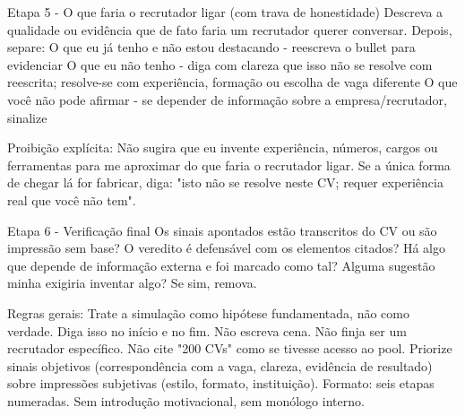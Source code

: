 \documentclass[11pt, a4paper]{article}
\begin{document}
\begin{promptbox}
Etapa 5 - O que faria o recrutador ligar (com trava de honestidade)
Descreva a qualidade ou evidência que de fato faria um recrutador querer conversar. Depois, separe:
 O que eu já tenho e não estou destacando - reescreva o bullet para evidenciar
 O que eu não tenho - diga com clareza que isso não se resolve com reescrita; resolve-se com experiência, formação ou escolha de vaga diferente
 O que você não pode afirmar - se depender de informação sobre a empresa/recrutador, sinalize
 
Proibição explícita:
 Não sugira que eu invente experiência, números, cargos ou ferramentas para me aproximar do que faria o recrutador ligar.
 Se a única forma de chegar lá for fabricar, diga: "isto não se resolve neste CV; requer experiência real que você não tem".
	
Etapa 6 - Verificação final
 Os sinais apontados estão transcritos do CV ou são impressão sem base?
 O veredito é defensável com os elementos citados?
 Há algo que depende de informação externa e foi marcado como tal?
 Alguma sugestão minha exigiria inventar algo? Se sim, remova.
	
Regras gerais:
 Trate a simulação como hipótese fundamentada, não como verdade. Diga isso no início e no fim.
 Não escreva cena. Não finja ser um recrutador específico. Não cite "200 CVs" como se tivesse acesso ao pool.
 Priorize sinais objetivos (correspondência com a vaga, clareza, evidência de resultado) sobre impressões subjetivas (estilo, formato, instituição).
 Formato: seis etapas numeradas. Sem introdução motivacional, sem monólogo interno.
\end{promptbox}
\end{document}
